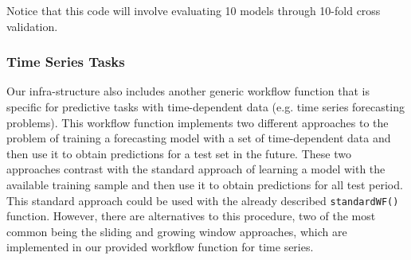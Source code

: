 \documentclass[10pt,a4paper]{article}\usepackage[]{graphicx}\usepackage[]{color}
\begin{document}
Notice that this code will involve evaluating 10 models through
10-fold cross validation. 


\subsubsection{Time Series Tasks}

Our infra-structure also includes another generic workflow function
that is specific for predictive tasks with time-dependent data
(e.g. time series forecasting problems). This workflow function
implements two different approaches to the problem of training a
forecasting model with a set of time-dependent data and then use it to
obtain predictions for a test set in the future. These two approaches
contrast with the standard approach of learning a model with the
available training sample and then use it to obtain predictions for
all test period. This standard approach could be used with the already
described \texttt{standardWF()} function. However, there are
alternatives to this procedure, two of the most common being the
sliding and growing window approaches, which are implemented in our
provided workflow function for time series.
\end{document}

